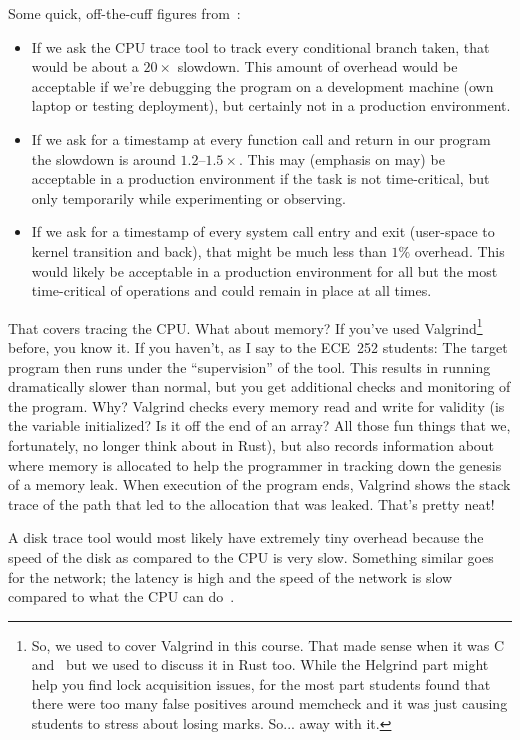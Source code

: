 Some quick, off-the-cuff figures from~\cite{usd}:
\begin{itemize}
	\item If we ask the CPU trace tool to track every conditional branch taken, that would be about a $20\times$ slowdown. This amount of overhead would be acceptable if we're debugging the program on a development machine (own laptop or testing deployment), but certainly not in a production environment.
	\item If we ask for a timestamp at every function call and return in our program the slowdown is around $1.2$--$1.5\times$. This may (emphasis on may) be acceptable in a production environment if the task is not time-critical, but only temporarily while experimenting or observing.
	\item If we ask for a timestamp of every system call entry and exit (user-space to kernel transition and back), that might be much less than $1\%$ overhead. This would likely be acceptable in a production environment for all but the most time-critical of operations and could remain in place at all times.
\end{itemize}

That covers tracing the CPU. What about memory? If you've used Valgrind\footnote{So, we used to cover Valgrind in this course. That made sense when it was C and \CPP~but we used to discuss it in Rust too. While the Helgrind part might help you find lock acquisition issues, for the most part students found that there were too many false positives around memcheck and it was just causing students to stress about losing marks. So... away with it.} before, you know it. If you haven't, as I say to the ECE~252 students: The target program then runs under the ``supervision'' of the tool. This results in running dramatically slower than normal, but you get additional checks and monitoring of the program. Why? Valgrind checks every memory read and write for validity (is the variable initialized? Is it off the end of an array? All those fun things that we, fortunately, no longer think about in Rust), but also records information about where memory is allocated to help the programmer in tracking down the genesis of a memory leak. When execution of the program ends, Valgrind shows the stack trace of the path that led to the allocation that was leaked. That's pretty neat!

A disk trace tool would most likely have extremely tiny overhead because the speed of the disk as compared to the CPU is very slow. Something similar goes for the network; the latency is high and the speed of the network is slow compared to what the CPU can do~\cite{usd}. 

